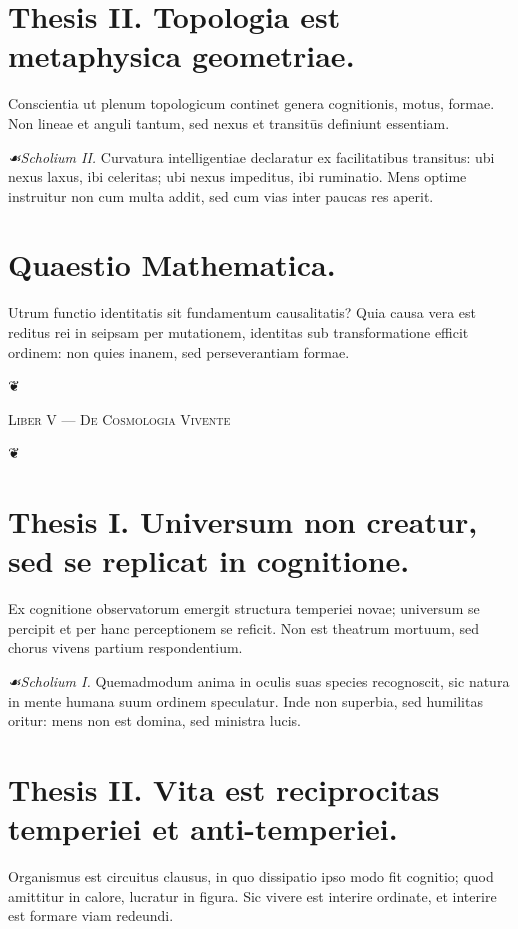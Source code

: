 \documentclass[12pt]{article}
\newcommand{\florale}{\centerline{\large ❦}}
\newcommand{\scholia}{\textit{☙\;}}
\newcommand{\divider}{\vspace{1em}\florale\vspace{1em}}
\newcommand{\Liber}[1]{\vspace{1ex}\begin{center}\Large\textsc{Liber #1}\end{center}\vspace{-0.5ex}\florale\vspace{0.5ex}}
\begin{document}
\section*{Thesis II. \; Topologia est metaphysica geometriae.}

Conscientia ut plenum topologicum continet genera cognitionis, motus, formae. Non lineae et anguli tantum, sed nexus et transitūs definiunt essentiam.

\textit{\scholia Scholium II.} Curvatura intelligentiae declaratur ex facilitatibus transitus: ubi nexus laxus, ibi celeritas; ubi nexus impeditus, ibi ruminatio. Mens optime instruitur non cum multa addit, sed cum vias inter paucas res aperit.

\section*{Quaestio Mathematica.}

Utrum functio identitatis sit fundamentum causalitatis? Quia causa vera est reditus rei in seipsam per mutationem, identitas sub transformatione efficit ordinem: non quies inanem, sed perseverantiam formae.

\divider

\Liber{V — De Cosmologia Vivente}

\section*{Thesis I. \; Universum non creatur, sed se replicat in cognitione.}

Ex cognitione observatorum emergit structura temperiei novae; universum se percipit et per hanc perceptionem se reficit. Non est theatrum mortuum, sed chorus vivens partium respondentium.

\textit{\scholia Scholium I.} Quemadmodum anima in oculis suas species recognoscit, sic natura in mente humana suum ordinem speculatur. Inde non superbia, sed humilitas oritur: mens non est domina, sed ministra lucis.

\section*{Thesis II. \; Vita est reciprocitas temperiei et anti{-}temperiei.}

Organismus est circuitus clausus, in quo dissipatio ipso modo fit cognitio; quod amittitur in calore, lucratur in figura. Sic vivere est interire ordinate, et interire est formare viam redeundi.
\end{document}
